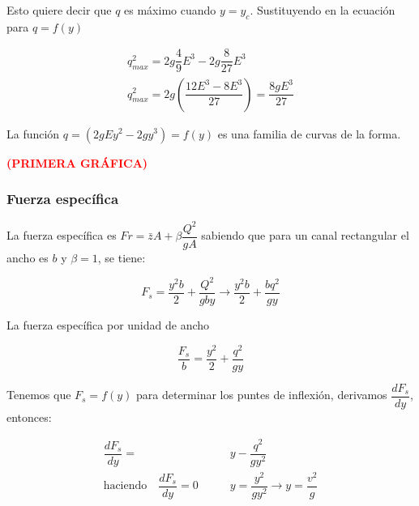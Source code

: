 \documentclass[11pt, oneside]{article}
\begin{document}
Esto quiere decir que $q$ es máximo cuando $y=y_{c}$. Sustituyendo en la ecuación para $q=f(y)$ 

\begin{equation}
    \begin{aligned}
        q^{2}_{max}=2g\dfrac{4}{9}E^{3}-2g\dfrac{8}{27}E^{3}\\
        q^{2}_{max}=2g\left(\dfrac{12E^{3}-8E^{3}}{27}\right)=\dfrac{8gE^{3}}{27}
    \end{aligned}  
\end{equation}

La función $q=(2gEy^{2}-2gy^{3})=f(y)$ es una familia de curvas de la forma. \vspace{3ex}


\textcolor{red}{\textbf{(PRIMERA GRÁFICA)}} \vspace{1ex}


\subsubsection{Fuerza específica}

La fuerza específica es $Fr=\bar{z}A+\beta\dfrac{Q^{2}}{gA}$ sabiendo que para un canal rectangular el ancho es $b$ y $\beta=1$, se tiene:

\begin{equation}
    F_{s}=\dfrac{y^{2}b}{2}+\dfrac{Q^{2}}{gby} \rightarrow \dfrac{y^{2}b}{2}+\dfrac{bq^{2}}{gy}
\end{equation}

La fuerza específica por unidad de ancho

\begin{equation}
    \dfrac{F_{s}}{b}=\dfrac{y^{2}}{2}+\dfrac{q^{2}}{gy}
\end{equation}

Tenemos que $F_{s}=f(y)$ para determinar los puntes de inflexión, derivamos $\dfrac{dF_{s}}{dy}$, entonces:

\begin{equation}
    \begin{aligned}
        \dfrac{dF_{s}}{dy}=&y-\dfrac{q^{2}}{gy^{2}}\\
        \text{haciendo} \quad \dfrac{dF_{s}}{dy}=0 \qquad &y=\dfrac{y^{2}}{gy^{2}}\rightarrow y=\dfrac{v^{2}}{g}
    \end{aligned}
    \label{ecu:V}
\end{equation}
\end{document}
